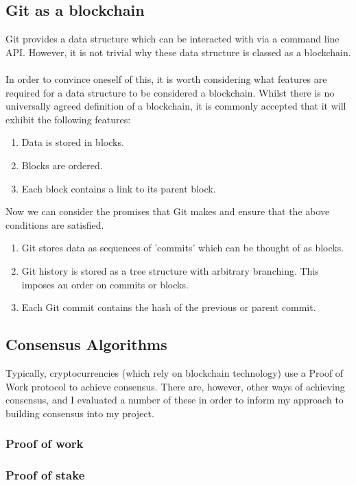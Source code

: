 \documentclass[12pt,a4paper,twoside,openright]{report}
\begin{document}
		\subsection{Git as a blockchain}
			Git provides a data structure which can be interacted with via a command line API. However, it is not trivial why these data structure is classed as a blockchain. \\
			\\
			In order to convince oneself of this, it is worth considering what features are required for a data structure to be considered a blockchain. 
			Whilst there is no universally agreed definition of a blockchain, it is commonly accepted that it will exhibit the following features:
			\begin{enumerate}
				\item Data is stored in blocks.
				\item Blocks are ordered.
				\item Each block contains a link to its parent block.
			\end{enumerate}
			Now we can consider the promises that Git makes and ensure that the above conditions are satisfied.\\
			\begin{enumerate}
				\item Git stores data as sequences of 'commits' which can be thought of as blocks.
				\item Git history is stored as a tree structure with arbitrary branching. This imposes an order on commits or blocks.
				\item Each Git commit contains the hash of the previous or parent commit.
			\end{enumerate}
		\subsection{Consensus Algorithms}
			Typically, cryptocurrencies (which rely on blockchain technology) use a Proof of Work protocol to achieve consensus. 
			There are, however, other ways of achieving consensus, and I evaluated a number of these in order to inform my approach to building consensus into my project. \\ 
			\subsubsection*{Proof of work}
			\subsubsection*{Proof of stake}
\end{document}
